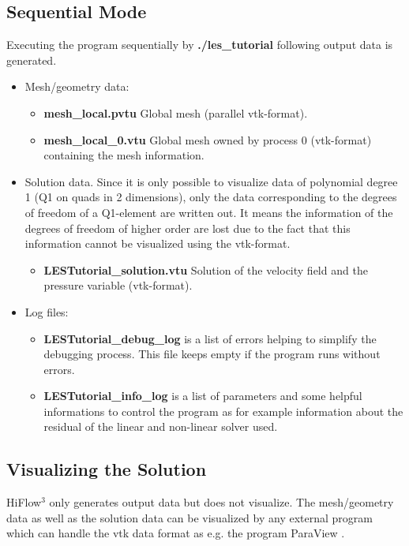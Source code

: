 \documentclass[a4paper, 11pt, twoside]{article}
\begin{document}
\subsection{Sequential Mode}
Executing the program sequentially by \textbf{./les\_tutorial} following output data is generated. 
\begin{itemize}
\item Mesh/geometry data:
\begin{itemize}
\item \textbf{mesh\_local.pvtu} Global mesh (parallel vtk-format). 
\item \textbf{mesh\_local\_0.vtu} Global mesh owned by process 0 (vtk-format) containing the mesh information.
\end{itemize}
\item Solution data. Since it is only possible to visualize data of polynomial degree 1 (Q1 on quads in 2 dimensions), only the data corresponding to the degrees of freedom of a Q1-element are written out. It means the information of the degrees of freedom of higher order are lost due to the fact that this information cannot be visualized using the vtk-format.
\begin{itemize}
\item \textbf{LESTutorial\_solution.vtu} Solution of the velocity field and the pressure variable (vtk-format). 
\end{itemize}
\item Log files:
\begin{itemize}
\item \textbf{LESTutorial\_debug\_log} is a list of errors helping to simplify the debugging process. This file keeps empty if the program runs without errors.
\item \textbf{LESTutorial\_info\_log} is a list of parameters and some helpful informations to control the program as for example information about the residual of the linear and non-linear solver used.
\end{itemize}
\end{itemize}

\subsection{Visualizing the Solution}
HiFlow$^3$ only generates output data but does not visualize. The mesh/geometry data as well as the solution data can be visualized 
by any external program which can handle the vtk data format as e.g. the program ParaView \cite{Paraview}. 
\end{document}
